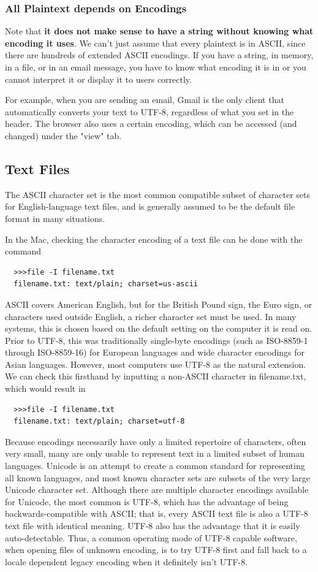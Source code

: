 \documentclass{article}
\begin{document}
  \subsubsection{All Plaintext depends on Encodings}
  Note that \textbf{it does not make sense to have a string without knowing what encoding it uses}. We can't just assume that every plaintext is in ASCII, since there are hundreds of extended ASCII encodings. If you have a string, in memory, in a file, or in an email message, you have to know what encoding it is in or you cannot interpret it or display it to users correctly. 

  For example, when you are sending an email, Gmail is the only client that automatically converts your text to UTF-8, regardless of what you set in the header. The browser also uses a certain encoding, which can be accessed (and changed) under the "view" tab. 

  \subsection{Text Files}
  The ASCII character set is the most common compatible subset of character sets for English-language text files, and is generally assumed to be the default file format in many situations. 

  In the Mac, checking the character encoding of a text file can be done with the command 
  \begin{lstlisting}
  >>>file -I filename.txt
  filename.txt: text/plain; charset=us-ascii
  \end{lstlisting}
  ASCII covers American English, but for the British Pound sign, the Euro sign, or characters used outside English, a richer character set must be used. In many systems, this is chosen based on the default setting on the computer it is read on. Prior to UTF-8, this was traditionally single-byte encodings (such as ISO-8859-1 through ISO-8859-16) for European languages and wide character encodings for Asian languages. However, most computers use UTF-8 as the natural extension. We can check this firsthand by inputting a non-ASCII character in filename.txt, which would result in
  \begin{lstlisting}
  >>>file -I filename.txt
  filename.txt: text/plain; charset=utf-8
  \end{lstlisting}
  Because encodings necessarily have only a limited repertoire of characters, often very small, many are only usable to represent text in a limited subset of human languages. Unicode is an attempt to create a common standard for representing all known languages, and most known character sets are subsets of the very large Unicode character set. Although there are multiple character encodings available for Unicode, the most common is UTF-8, which has the advantage of being backwards-compatible with ASCII; that is, every ASCII text file is also a UTF-8 text file with identical meaning. UTF-8 also has the advantage that it is easily auto-detectable. Thus, a common operating mode of UTF-8 capable software, when opening files of unknown encoding, is to try UTF-8 first and fall back to a locale dependent legacy encoding when it definitely isn't UTF-8.
\end{document}
